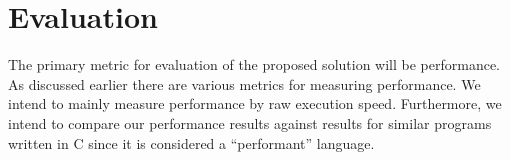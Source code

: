 \documentclass[preprint,10pt,numbers]{sigplanconf}
\begin{document}

    

  \section{Evaluation}
  The primary metric for evaluation of the proposed solution will be performance. As discussed earlier there are various metrics for measuring performance. We intend to mainly measure performance by raw execution speed. Furthermore, we intend to compare our performance results against results for similar programs written in C since it is considered a ``performant'' language. 
\end{document}
